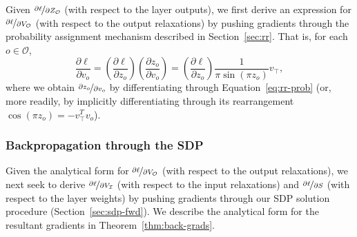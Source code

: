 \documentclass{article}
\newcommand{\outdex}{o}
\newcommand{\truthvar}{\top}
\newcommand{\inset}{\mathcal{I}}
\newcommand{\outset}{\mathcal{O}}
\begin{document}
	Given $\nicefrac{\partial \ell}{\partial Z_{\outset}}$ (with respect to the layer outputs), we first derive an expression for $\nicefrac{\partial \ell}{\partial V_{\outset}}$ (with respect to the output relaxations) by pushing gradients through the probability assignment mechanism described in Section~\ref{sec:rr}.
	That is, for each $\outdex \in \outset$,
	\begin{equation}
		\label{eq:dl-dvout}
		\frac{\partial \ell}{\partial v_{\outdex}} 
		= \left(  \frac{\partial \ell}{\partial z_{\outdex}} \right) \left( \frac{\partial z_{\outdex}}{\partial v_{\outdex}} \right) 
		=  \left(  \frac{\partial \ell}{\partial z_{\outdex}} \right) \frac{1}{\pi \sin(\pi z_{\outdex})} v_{\truthvar} ,
	\end{equation}
	where we obtain $\nicefrac{\partial z_{\outdex}}{\partial v_{\outdex}}$ by differentiating through Equation~\eqref{eq:rr-prob} (or, more readily, by implicitly differentiating through its rearrangement 
	$\cos(\pi z_{\outdex}) = -v_{\truthvar}^T v_{\outdex}$).

	\subsubsection{Backpropagation through the SDP}
	\label{sec:sdp-back}
	
	Given the analytical form for $\nicefrac{\partial \ell}{\partial V_{\outset}}$ (with respect to the output relaxations), we next seek to derive $\nicefrac{\partial \ell}{\partial V_{\inset}}$ (with respect to the input relaxations) and $\nicefrac{\partial \ell}{\partial S}$ (with respect to the layer weights) by pushing gradients through our SDP solution procedure (Section~\ref{sec:sdp-fwd}).
	We describe the analytical form for the resultant gradients in Theorem~\ref{thm:back-grads}.
	
\end{document}
